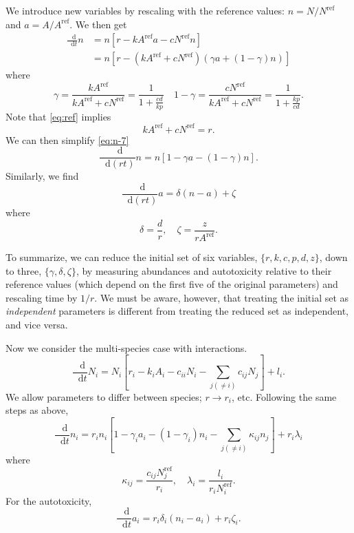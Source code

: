 \documentclass{article}
\newcommand{\diff}{\mathop{}\!\mathrm{d}}
\begin{document}
We introduce new variables by rescaling with the reference values: $n = N/N^\text{ref}$ and $a = A/A^\text{ref}$. We then get
\begin{align}
    \frac{\diff }{\diff t}n &= n\left[ r - k A^\text{ref} a - c N^\text{ref} n \right]  \\
    &= n \left[ r - (k A^\text{ref} + c N^\text{ref}) ( \gamma a + (1-\gamma) n ) \right] \label{eq:n-7}
\end{align}
where
\begin{equation}
    \gamma = \frac{k A^\text{ref}}{k A^\text{ref} + c N^\text{ref}} = \frac{1}{1 + \frac{cd}{kp}}\quad 1-\gamma = \frac{c N^\text{ref}}{k A^\text{ref} + c N^\text{ref}} = \frac{1}{1 + \frac{kp}{cd}}.
\end{equation}
Note that \eqref{eq:ref} implies
\begin{equation}
    k A^\text{ref} + c N^\text{ref} = r.
\end{equation}
We can then simplify \eqref{eq:n-7}
\begin{equation}
    \frac{\diff}{\diff(rt)} n = n\left[ 1 - \gamma a - (1-\gamma) n \right].
\end{equation}
Similarly, we find
\begin{equation}
    \frac{\diff}{\diff(rt)} a = \delta ( n - a) + \zeta
\end{equation}
where
\begin{equation}
    \delta = \frac{d}{r},\quad \zeta = \frac{z}{r  A^\text{ref}}.
\end{equation}

To summarize, we can reduce the initial set of six variables, $\{ r, k, c, p, d, z\}$, down to three, $\{ \gamma, \delta, \zeta \}$, by measuring abundances and autotoxicity relative to their reference values (which depend on the first five of the original parameters) and rescaling time by $1/r$. We must be aware, however, that treating the initial set as \textit{independent} parameters is different from treating the reduced set as independent, and vice versa.


Now we consider the multi-species case with interactions.
\begin{equation}
    \frac{\diff }{\diff t} {N}_i = N_i \left[ r_i - k_i A_i - c_{ii} N_i - \sum_{j(\neq i)} c_{ij}N_j \right] + l_i.
\end{equation}
We allow parameters to differ between species; $r\to r_i$, etc. Following the same steps as above,
\begin{equation}
    \frac{\diff }{\diff t} n_i = r_i n_i \left[ 1 - \gamma_i a_i - (1 - \gamma_i)n_i - \sum_{j(\neq i)}  \kappa_{ij} n_j   \right] + r_i \lambda_i
\end{equation}
where
\begin{equation}
    \kappa_{ij} = \frac{c_{ij} N_j^\text{ref}}{r_i},\quad \lambda_i = \frac{l_i}{r_i N_i^\text{ref}}.
\end{equation}
For the autotoxicity,
\begin{equation}
    \frac{\diff }{\diff t} a_i = r_i \delta_i (n_i - a_i) + r_i \zeta_i.
\end{equation}
\end{document}
